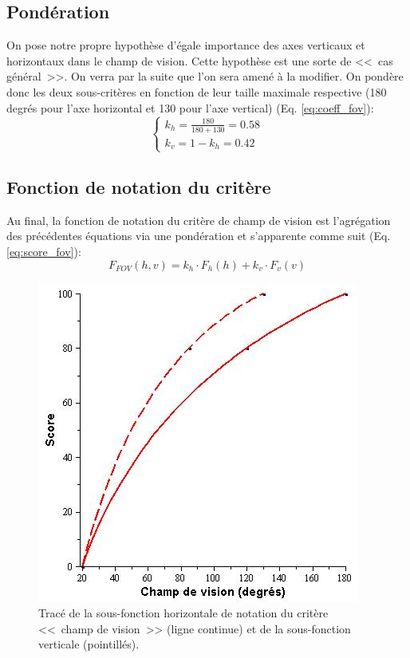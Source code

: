 	\subsection{Pondération}
	\par On pose notre propre hypothèse d'égale importance des axes verticaux et horizontaux dans le champ de vision. Cette hypothèse est une sorte de <<~cas général~>>. On verra par la suite que l'on sera amené à la modifier. On pondère donc les deux sous-critères en fonction de leur taille maximale respective (180 degrés pour l'axe horizontal et 130 pour l'axe vertical) (Eq. \ref{eq:coeff_fov}):
	\begin{equation}
		\begin{cases}	
			k_h = \frac{180}{180 + 130} = 0.58\\
			k_v = 1 - k_h = 0.42
		\end{cases}
		\label{eq:coeff_fov}
	\end{equation}
	
	\subsection{Fonction de notation du critère}
	\par Au final, la fonction de notation du critère de champ de vision est l'agrégation des précédentes équations via une pondération et s'apparente comme suit (Eq. \ref{eq:score_fov}):
	\begin{equation}
	F_{FOV}(h,v) = k_h \cdot F_h(h) + k_v \cdot F_v(v)
	\label{eq:score_fov}
	\end{equation}

	\begin{figure}[h]
		\centering
		\includegraphics[scale=.75]{Figures/FOV}
		\caption{Tracé de la sous-fonction horizontale de notation du critère <<~champ de vision~>> (ligne continue) et de la sous-fonction verticale (pointillés).}
		\label{fig:score_fov}
	\end{figure}
	
